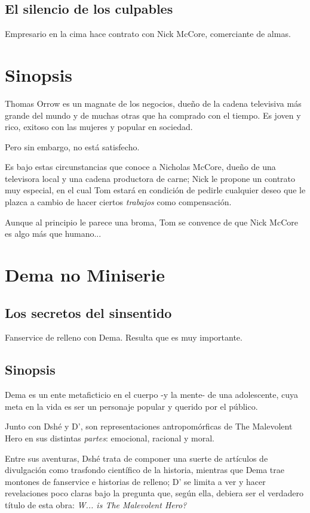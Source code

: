 \documentclass[letterpaper,12pt]{article}
\begin{document}
	\subsection*{El silencio de los culpables}
	
	Empresario en la cima hace contrato con Nick McCore, comerciante de almas.
	
	\section*{Sinopsis}
	
	Thomas Orrow es un magnate de los negocios, dueño de la cadena televisiva más
	grande del mundo y de muchas otras que ha comprado con el tiempo. Es joven y rico,
	exitoso con las mujeres y popular en sociedad.
	
	Pero sin embargo, no está satisfecho.
	
	Es bajo estas circunstancias que conoce a Nicholas McCore, dueño de una televisora
	local y una cadena productora de carne; Nick le propone un contrato muy
	especial, en el cual Tom estará en condición de pedirle cualquier deseo que
	le plazca a cambio de hacer ciertos \textit{trabajos} como compensación.
	
	Aunque al principio le parece una broma, Tom se convence de que Nick McCore es
	algo más que humano...
	
	\newpage
	
	\section*{Dema no Miniserie}
	
	\subsection*{Los secretos del sinsentido}
	
	Fanservice de relleno con Dema. Resulta que es muy importante.
	
	\subsection*{Sinopsis}
	
	Dema es un ente metaficticio en el cuerpo -y la mente- de una adolescente,
	cuya meta en la vida es ser un personaje popular y querido por el público.
	
	Junto con Dshé y D', son representaciones antropomórficas de The Malevolent Hero
	en sus distintas \textit{partes}: emocional, racional y moral.
	
	Entre sus aventuras, Dshé trata de componer una suerte de artículos de divulgación como
	trasfondo científico de la historia, mientras que Dema trae montones de fanservice
	e historias de relleno; D' se limita a ver y hacer revelaciones poco claras bajo
	la pregunta que, según ella, debiera ser el verdadero título de esta obra: 
	\textit{W... is The Malevolent Hero?}
	
\end{document}
